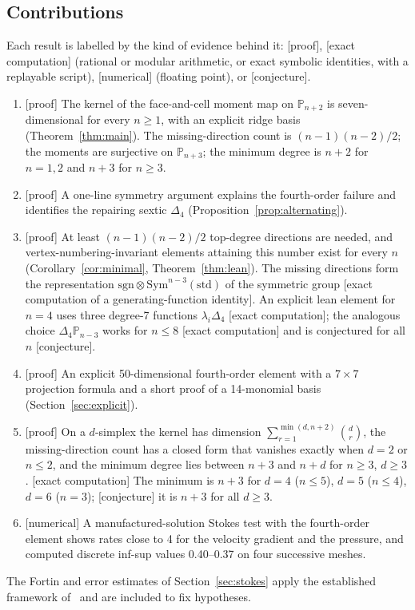 \documentclass[11pt,a4paper]{article}
\theoremstyle{definition}
\theoremstyle{remark}
\newcommand{\evid}[1]{\textsf{[#1]}}
\newcommand{\Pol}{\mathbb P}
\begin{document}
\subsection{Contributions}

Each result is labelled by the kind of evidence behind it:
\evid{proof}, \evid{exact computation} (rational or modular arithmetic,
or exact symbolic identities, with a replayable script),
\evid{numerical} (floating point), or \evid{conjecture}.
\begin{enumerate}
\item \evid{proof} The kernel of the face-and-cell moment map on
 \(\Pol_{n+2}\) is seven-dimensional for every \(n\ge1\), with an explicit
 ridge basis (Theorem~\ref{thm:main}). The missing-direction count is
 \((n-1)(n-2)/2\); the moments are surjective on \(\Pol_{n+3}\); the
 minimum degree is \(n+2\) for \(n=1,2\) and \(n+3\) for \(n\ge3\).
\item \evid{proof} A one-line symmetry argument explains the fourth-order
 failure and identifies the repairing sextic \(\Delta_4\)
 (Proposition~\ref{prop:alternating}).
\item \evid{proof} At least \((n-1)(n-2)/2\) top-degree directions are
 needed, and vertex-numbering-invariant elements attaining this number
 exist for every \(n\) (Corollary~\ref{cor:minimal}, Theorem~\ref{thm:lean}).
 The missing directions form the representation
 \(\mathrm{sgn}\otimes\mathrm{Sym}^{n-3}(\mathrm{std})\) of the symmetric
 group \evid{exact computation of a generating-function identity}. An
 explicit lean element for \(n=4\) uses three degree-7 functions
 \(\lambda_i\Delta_4\) \evid{exact computation}; the analogous choice
 \(\Delta_4\Pol_{n-3}\) works for \(n\le8\) \evid{exact computation} and is
 conjectured for all \(n\) \evid{conjecture}.
\item \evid{proof} An explicit 50-dimensional fourth-order element with a
 \(7\times7\) projection formula and a short proof of a 14-monomial basis
 (Section~\ref{sec:explicit}).
\item \evid{proof} On a \(d\)-simplex the kernel has dimension
 \(\sum_{r=1}^{\min(d,n+2)}\binom dr\), the missing-direction count has a
 closed form that vanishes exactly when \(d=2\) or \(n\le2\), and the minimum
 degree lies between \(n+3\) and \(n+d\) for \(n\ge3\), \(d\ge3\).
 \evid{exact computation} The minimum is \(n+3\) for \(d=4\) (\(n\le5\)),
 \(d=5\) (\(n\le4\)), \(d=6\) (\(n=3\)); \evid{conjecture} it is \(n+3\)
 for all \(d\ge3\).
\item \evid{numerical} A manufactured-solution Stokes test with the
 fourth-order element shows rates close to 4 for the velocity gradient
 and the pressure, and computed discrete inf-sup values 0.40--0.37 on four
 successive meshes.
\end{enumerate}
The Fortin and error estimates of Section~\ref{sec:stokes} apply the
established framework of~\cite{CR1973,BAJO2025} and are included to fix
hypotheses.
\end{document}
